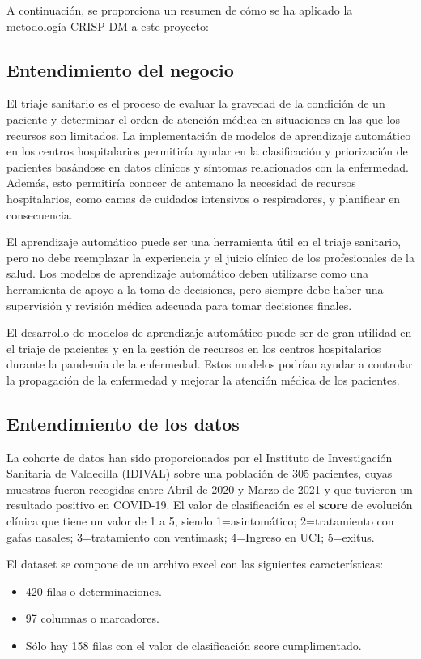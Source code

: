 
A continuación, se proporciona un resumen de cómo se ha aplicado la metodología CRISP-DM a este proyecto:

\subsection{Entendimiento del negocio}
El triaje sanitario es el proceso de evaluar la gravedad de la condición de un paciente y determinar el orden de atención médica en situaciones en las que los recursos son limitados. La implementación de modelos de aprendizaje automático en los centros hospitalarios permitiría ayudar en la clasificación y priorización de pacientes basándose en datos clínicos y síntomas relacionados con la enfermedad. Además, esto permitiría conocer de antemano la necesidad de recursos hospitalarios, como camas de cuidados intensivos o respiradores, y planificar en consecuencia.

El aprendizaje automático puede ser una herramienta útil en el triaje sanitario, pero no debe reemplazar la experiencia y el juicio clínico de los profesionales de la salud. Los modelos de aprendizaje automático deben utilizarse como una herramienta de apoyo a la toma de decisiones, pero siempre debe haber una supervisión y revisión médica adecuada para tomar decisiones finales.

El desarrollo de modelos de aprendizaje automático puede ser de gran utilidad en el triaje de pacientes y en la gestión de recursos en los centros hospitalarios durante la pandemia de la enfermedad. Estos modelos podrían ayudar a controlar la propagación de la enfermedad y mejorar la atención médica de los pacientes.

\subsection{Entendimiento de los datos}
La cohorte de datos han sido proporcionados por el Instituto de Investigación Sanitaria de Valdecilla (IDIVAL) sobre una población de 305 pacientes, cuyas muestras fueron recogidas entre Abril de 2020 y Marzo de 2021 y que tuvieron un resultado positivo en COVID-19. El valor de clasificación es el \textbf{score} de evolución clínica que tiene un valor de 1 a 5, siendo 1=asintomático; 2=tratamiento con gafas nasales; 3=tratamiento con ventimask; 4=Ingreso en UCI; 5=exitus.

El dataset se compone de un archivo excel con las siguientes características:
\begin{itemize}
	\item 420 filas o determinaciones.
	\item 97 columnas o marcadores.
    \item Sólo hay 158 filas con el valor de clasificación score cumplimentado.
\end{itemize}


